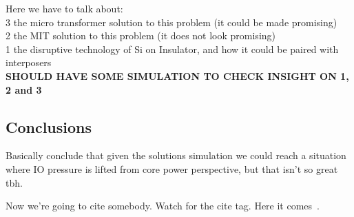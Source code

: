 \documentclass[letterpaper,twocolumn,10pt]{article}
\begin{document}
Here we have to talk about:\\
3 the micro transformer solution to this problem (it could be made promising) \\
2 the MIT solution to this problem (it does not look promising)\\
1 the disruptive technology of Si on Insulator, and how it could be paired with interposers\\
\textbf{SHOULD HAVE SOME SIMULATION TO CHECK INSIGHT ON 1, 2 and 3}\\

\subsection{Conclusions}

Basically conclude that given the solutions simulation we could reach a situation where IO pressure is lifted from core power perspective, but that isn't so great tbh. 


Now we're going to cite somebody.  Watch for the cite tag.
Here it comes~\cite{Einstein}.  


{\footnotesize 
}


\theendnotes
\end{document}
